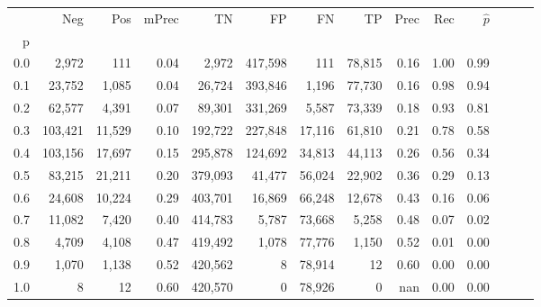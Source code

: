 \begin{tabular}{rrrrrrrrrrrrrr}
\toprule
{} &      Neg &     Pos & mPrec &       TN &       FP &      FN &      TP &  Prec &   Rec & $\hat{p}$ \\
p   &          &         &       &          &          &         &         &       &       &           \\
\midrule
0.0 &    2,972 &     111 &  0.04 &    2,972 &  417,598 &     111 &  78,815 &  0.16 &  1.00 &      0.99 \\
0.1 &   23,752 &   1,085 &  0.04 &   26,724 &  393,846 &   1,196 &  77,730 &  0.16 &  0.98 &      0.94 \\
0.2 &   62,577 &   4,391 &  0.07 &   89,301 &  331,269 &   5,587 &  73,339 &  0.18 &  0.93 &      0.81 \\
0.3 &  103,421 &  11,529 &  0.10 &  192,722 &  227,848 &  17,116 &  61,810 &  0.21 &  0.78 &      0.58 \\
0.4 &  103,156 &  17,697 &  0.15 &  295,878 &  124,692 &  34,813 &  44,113 &  0.26 &  0.56 &      0.34 \\
0.5 &   83,215 &  21,211 &  0.20 &  379,093 &   41,477 &  56,024 &  22,902 &  0.36 &  0.29 &      0.13 \\
0.6 &   24,608 &  10,224 &  0.29 &  403,701 &   16,869 &  66,248 &  12,678 &  0.43 &  0.16 &      0.06 \\
0.7 &   11,082 &   7,420 &  0.40 &  414,783 &    5,787 &  73,668 &   5,258 &  0.48 &  0.07 &      0.02 \\
0.8 &    4,709 &   4,108 &  0.47 &  419,492 &    1,078 &  77,776 &   1,150 &  0.52 &  0.01 &      0.00 \\
0.9 &    1,070 &   1,138 &  0.52 &  420,562 &        8 &  78,914 &      12 &  0.60 &  0.00 &      0.00 \\
1.0 &        8 &      12 &  0.60 &  420,570 &        0 &  78,926 &       0 &   nan &  0.00 &      0.00 \\
\bottomrule
\end{tabular}
